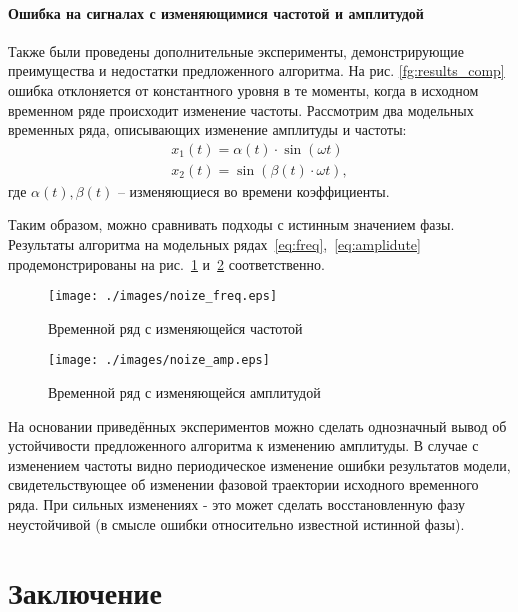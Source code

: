 \documentclass[12pt, twoside]{article}
\theoremstyle{definition}
\begin{document}
\paragraph{Ошибка на сигналах с изменяющимися частотой и амплитудой}
Также были проведены дополнительные эксперименты, демонстрирующие преимущества и недостатки предложенного алгоритма. На рис. \ref{fg:results_comp} ошибка отклоняется от константного уровня в те моменты, когда в исходном временном ряде происходит изменение частоты. Рассмотрим два модельных временных ряда, описывающих изменение амплитуды и частоты:
\abovedisplayskip=0pt
\belowdisplayskip=0pt
\noindent
\begin{gather}
    x_1(t) = \alpha(t)\cdot\sin(\omega t) \label{eq:freq}\\
    x_2(t) = \sin(\beta(t)\cdot \omega t) \label{eq:amplidute},
\end{gather}
где $\alpha(t), \beta(t)$ -- изменяющиеся во времени коэффициенты.

Таким образом, можно сравнивать подходы с истинным значением фазы. Результаты алгоритма на модельных рядах~\eqref{eq:freq},~\eqref{eq:amplidute} продемонстрированы на рис.~\ref{fg:noise_freq} и~\ref{fg:noize_amp} соответственно.
\begin{figure}[ht]
\centering
{\texttt{[image: ./images/noize\_freq.eps]}}

\caption{Временной ряд с изменяющейся частотой}
\label{fg:noise_freq}
\end{figure}
\abovedisplayskip=0pt
\belowdisplayskip=0pt
\noindent
\begin{figure}[ht]
\centering
{\texttt{[image: ./images/noize\_amp.eps]}}

\caption{Временной ряд с изменяющейся амплитудой}
\label{fg:noize_amp}
\end{figure}

На основании приведённых экспериментов можно сделать однозначный вывод об устойчивости предложенного алгоритма к изменению амплитуды. В случае с изменением частоты видно периодическое изменение ошибки результатов модели, свидетельствующее об изменении фазовой траектории исходного временного ряда. При сильных изменениях - это может сделать восстановленную фазу неустойчивой (в смысле ошибки относительно известной истинной фазы).

\section{Заключение}
 
\end{document}
